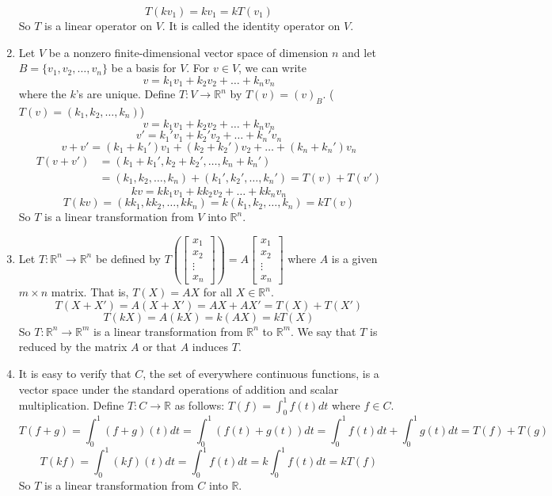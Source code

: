 \documentclass[12pt]{article}
\begin{document}
\begin{example}
\begin{enumerate}
 $$T(kv_1) = kv_1 = kT(v_1) $$ So $T$ is a linear operator on $V$. It is called the identity operator on $V$. 
 \item Let $V$ be a nonzero finite-dimensional vector space of dimension $n$ and let $B = \{v_1, v_2, \dots, v_n\}$ be a basis for $V$. For $v \in V$, we can write $$v = k_1v_1 + k_2v_2 + \dots + k_nv_n$$ where the $k$'s are unique. Define $T: V \to \mathbb{R}^n$ by $T(v) = (v)_B$. ($T(v) = (k_1, k_2, \dots, k_n)$) $$v = k_1v_1 + k_2v_2 + \dots + k_nv_n$$ $$v' = k_1'v_1 + k_2'v_2 + \dots + k_n'v_n$$ $$v + v' = (k_1 + k_1')v_1 + (k_2 + k_2')v_2 + \dots + (k_n + k_n')v_n $$ $$\begin{aligned} T(v + v') &= (k_1 + k_1', k_2 + k_2', \dots, k_n + k_n') \\ &= (k_1, k_2, \dots, k_n) + (k_1', k_2', \dots, k_n') = T(v) + T(v') \end{aligned} $$ 
 $$kv = kk_1v_1 + kk_2v_2 + \dots + kk_nv_n $$ $$T(kv) = (kk_1, kk_2, \dots, kk_n) = k(k_1, k_2, \dots, k_n) = kT(v) $$ So $T$ is a linear transformation from $V$ into $\mathbb{R}^n$. 
 \item Let $T: \mathbb{R}^n \to \mathbb{R}^n$ be defined by $T(\begin{bmatrix} x_1 \\ x_2 \\ \vdots \\ x_n \end{bmatrix}) = A\begin{bmatrix} x_1 \\ x_2 \\ \vdots \\ x_n \end{bmatrix} $ where $A$ is a given $m \times n$ matrix. That is, $T(X) = AX$ for all $X \in \mathbb{R}^n$. $$T(X + X') = A(X+ X') = AX + AX' = T(X) + T(X') $$ 
 $$T(kX) = A(kX) = k(AX) = kT(X) $$ So $T: \mathbb{R}^n \to \mathbb{R}^m$ is a linear transformation from $\mathbb{R}^n$ to $\mathbb{R}^m$. We say that $T$ is reduced by the matrix $A$ or that $A$ induces $T$. 
 \item It is easy to verify that $C$, the set of everywhere continuous functions, is a vector space under the standard operations of addition and scalar multiplication. Define $T: C \to \mathbb{R}$ as follows: $T(f) = \int_0^1 f(t)dt$ where $f \in C$. $$T(f + g) = \int_0^1 (f + g)(t)dt = \int_0^1 (f(t) + g(t))dt = \int_0^1 f(t)dt + \int_0^1 g(t)dt = T(f) + T(g) $$ 
 $$T(kf) = \int_0^1 (kf)(t)dt = \int_0^1 f(t)dt = k\int_0^1 f(t)dt = kT(f) $$ So $T$ is a linear transformation from $C$ into $\mathbb{R}$. \end{enumerate} \end{example} 
\end{document}
